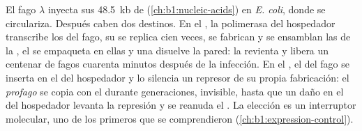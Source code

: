 \begin{proposition}\label{prop:b1:genomes:lambda}
El fago $\lambda$ inyecta sus \qty{48.5}{kb} de 
(\cref{ch:b1:nucleic-acids}) en \emph{E. coli}, donde se circulariza.
Después caben dos destinos. En el \emph{}, la polimerasa del
hospedador transcribe los  del fago, su  se replica cien veces, se
fabrican y se ensamblan las  de la , el  se empaqueta en
ellas y una  disuelve la pared: la  revienta y libera un
centenar de fagos cuarenta minutos después de la infección. En el
\emph{}, el  del fago se inserta en el  del
hospedador y lo silencia un represor de su propia fabricación: el
\emph{profago} se copia con el  durante generaciones, invisible,
hasta que un daño en el  del hospedador levanta la represión y se reanuda
el . La elección es un interruptor molecular, uno de los
primeros que se comprendieron (\cref{ch:b1:expression-control}).
\end{proposition}

